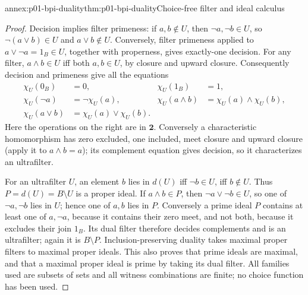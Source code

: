\begin{annexitem}{annex:p01-bpi-duality}{thm:p01-bpi-duality}{Choice-free filter and ideal calculus}
\begin{proof}
Decision implies filter primeness: if \(a,b\notin U\), then
\(\neg a,\neg b\in U\), so
\(\neg(a\vee b)\in U\) and \(a\vee b\notin U\).
Conversely, filter primeness applied to
\(a\vee\neg a=1_B\in U\), together with properness, gives
exactly-one decision. For any filter,
\(a\wedge b\in U\) iff both \(a,b\in U\), by closure and
upward closure. Consequently decision and primeness give all the equations
\[
\begin{aligned}
 \chi_U(0_B)&=0,&\chi_U(1_B)&=1,\\
 \chi_U(\neg a)&=\neg\chi_U(a),&
 \chi_U(a\wedge b)&=\chi_U(a)\wedge\chi_U(b),\\
 \chi_U(a\vee b)&=\chi_U(a)\vee\chi_U(b).&&
\end{aligned}
\]
Here the operations on the right are in \(\mathbf2\). Conversely a
characteristic homomorphism has zero excluded, one included, meet closure
and upward closure (apply it to \(a\wedge b=a\)); its complement
equation gives decision, so it characterizes an ultrafilter.

For an ultrafilter \(U\), an element \(b\) lies in \(d(U)\) iff
\(\neg b\in U\), iff \(b\notin U\). Thus \(P=d(U)=B\setminus U\)
is a proper ideal. If \(a\wedge b\in P\), then
\(\neg a\vee\neg b\in U\), so one of \(\neg a,\neg b\) lies
in \(U\); hence one of \(a,b\) lies in \(P\).
Conversely a prime ideal \(P\) contains at least one of \(a,\neg a\),
because it contains their zero meet, and not both, because it excludes
their join \(1_B\). Its dual filter therefore decides complements and
is an ultrafilter; again it is \(B\setminus P\). Inclusion-preserving
duality takes maximal proper filters to maximal proper ideals. This also
proves that prime ideals are maximal, and that a maximal proper ideal is
prime by taking its dual filter. All families used are subsets of sets and
all witness combinations are finite; no choice function has been used.
\end{proof}
\end{annexitem}

